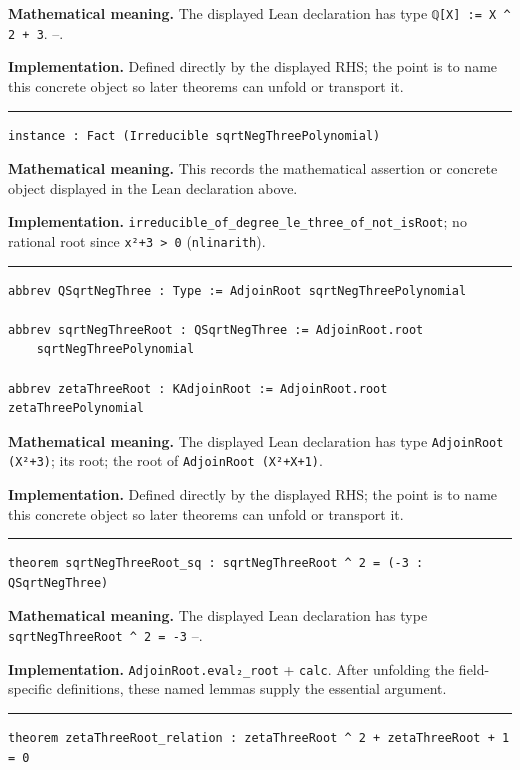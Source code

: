 \documentclass[UTF8,a4paper,11pt,fontset=fandol]{ctexart}
\theoremstyle{definition}
\newcommand{\statementsep}{\par\medskip\hrule\medskip}
\begin{document}
\noindent\textbf{Mathematical meaning.} The displayed Lean declaration has type \texttt{ℚ[X] := X \textasciicircum{} 2 + 3}. --.\par
\noindent\textbf{Implementation.} Defined directly by the displayed RHS; the point is to name this concrete object so later theorems can unfold or transport it.\par
\statementsep
\begin{verbatim}
instance : Fact (Irreducible sqrtNegThreePolynomial)
\end{verbatim}
\noindent\textbf{Mathematical meaning.} This records the mathematical assertion or concrete object displayed in the Lean declaration above.\par
\noindent\textbf{Implementation.} \texttt{irreducible\_\allowbreak{}of\_\allowbreak{}degree\_\allowbreak{}le\_\allowbreak{}three\_\allowbreak{}of\_\allowbreak{}not\_\allowbreak{}isRoot}; no rational root since \texttt{x²+3 > 0} (\texttt{nlinarith}).\par
\statementsep
\begin{verbatim}
abbrev QSqrtNegThree : Type := AdjoinRoot sqrtNegThreePolynomial

abbrev sqrtNegThreeRoot : QSqrtNegThree := AdjoinRoot.root
    sqrtNegThreePolynomial

abbrev zetaThreeRoot : KAdjoinRoot := AdjoinRoot.root zetaThreePolynomial
\end{verbatim}
\noindent\textbf{Mathematical meaning.} The displayed Lean declaration has type \texttt{AdjoinRoot (X²+3)}; its root; the root of \texttt{AdjoinRoot (X²+X+1)}.\par
\noindent\textbf{Implementation.} Defined directly by the displayed RHS; the point is to name this concrete object so later theorems can unfold or transport it.\par
\statementsep
\begin{verbatim}
theorem sqrtNegThreeRoot_sq : sqrtNegThreeRoot ^ 2 = (-3 : QSqrtNegThree)
\end{verbatim}
\noindent\textbf{Mathematical meaning.} The displayed Lean declaration has type \texttt{sqrtNegThreeRoot \textasciicircum{} 2 = -3} --.\par
\noindent\textbf{Implementation.} \texttt{AdjoinRoot.\allowbreak{}eval₂\_\allowbreak{}root} + \texttt{calc}. After unfolding the field-specific definitions, these named lemmas supply the essential argument.\par
\statementsep
\begin{verbatim}
theorem zetaThreeRoot_relation : zetaThreeRoot ^ 2 + zetaThreeRoot + 1 = 0
\end{verbatim}
\end{document}
